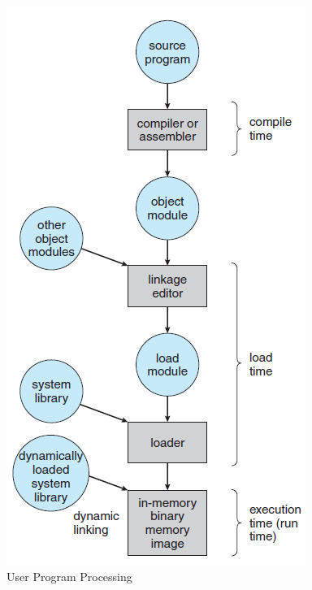 \documentclass{article}
\theoremstyle{plain}
\theoremstyle{definition}
\begin{document}
\begin{figure}[!ht]
    \centering
    \includegraphics[scale = 0.6]{os2.png}
    \caption{User Program Processing}
    \label{fig:my_label_3}
\end{figure}
\end{document}
